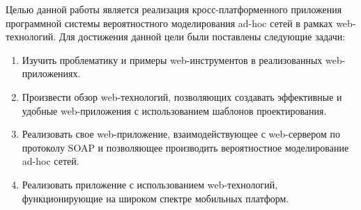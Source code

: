 Целью данной работы является реализация кросс-платформенного приложения программной системы вероятностного моделирования ad-hoc сетей в рамках web-технологий. Для достижения данной цели были поставлены следующие задачи:
\begin{enumerate}
 \item Изучить проблематику и примеры web-инструментов в реализованных web-приложениях.
 \item Произвести обзор web-технологий, позволяющих создавать эффективные и удобные web-приложения с использованием шаблонов проектирования.
 \item Реализовать свое web-приложение, взаимодействующее с web-сервером по протоколу SOAP и позволяющее производить вероятностное моделирование ad-hoc сетей.
 \item Реализовать приложение с использованием web-технологий, функционирующие на широком спектре мобильных платформ.
\end{enumerate}

\clearpage